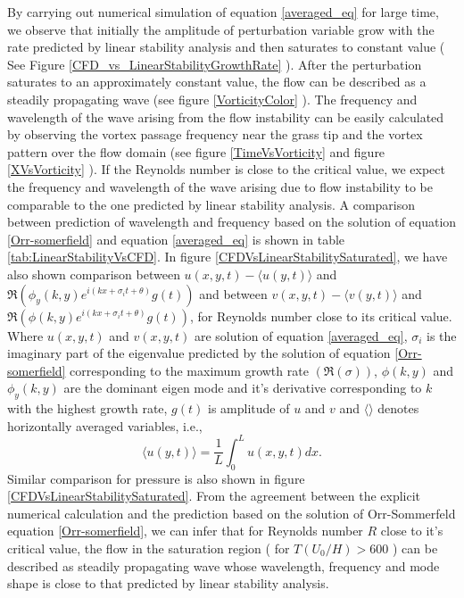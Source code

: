 \documentclass[12pt]{report}   %
\begin{document}
By carrying out numerical simulation of equation \eqref{averaged_eq} for large time, we observe that initially the amplitude of perturbation variable grow with the rate predicted by linear stability analysis and then saturates to constant value (  See Figure \ref{CFD_vs_LinearStabilityGrowthRate} ). After the perturbation saturates to an approximately constant value, the flow can be described as a steadily propagating wave (see figure \ref{VorticityColor} ). The frequency and wavelength of the wave arising from the flow instability can be easily calculated by observing the vortex passage frequency near the grass tip and the vortex pattern over the flow domain (see figure \ref{TimeVsVorticity} and figure \ref{XVsVorticity} ). If the Reynolds number is close to the critical value, we expect the frequency and wavelength of the wave arising due to flow instability to be comparable to the one predicted by linear stability analysis. A comparison between prediction of wavelength and frequency based on the solution of equation \eqref{Orr-somerfield} and equation \eqref{averaged_eq} is shown in table \ref{tab:LinearStabilityVsCFD}. In figure \ref{CFDVsLinearStabilitySaturated}, we have also shown comparison between $u(x,y,t)- \langle u(y,t) \rangle$ and 
 $\Re\left(\phi_y(k,y) e^{i\left(kx+\sigma_i t+ \theta\right)} g(t) \right)$  and between $v(x,y,t)-\langle v(y,t) \rangle$ and $\Re\left(\phi(k,y) e^{i\left(kx+\sigma_i t+ \theta\right)} g(t) \right)$, for Reynolds number close to its critical value. Where $u(x,y,t)$ and $v(x,y,t)$ are solution of equation \eqref{averaged_eq}, $\sigma_i$ is the imaginary part of the eigenvalue predicted by the solution of equation \eqref{Orr-somerfield} corresponding to the maximum growth rate $(\Re(\sigma))$, $\phi(k,y)$ and $\phi_y(k,y)$ are the dominant eigen mode and it's derivative corresponding to $k$ with the highest growth rate, $g(t)$ is amplitude of $u$ and $v$ and $\langle  \rangle$ denotes horizontally averaged variables, i.e.,
 \[\langle u(y,t) \rangle = \frac{1}{L}\int_{0}^{L} u(x,y,t) dx .\]
 Similar comparison for pressure is also shown in figure \ref{CFDVsLinearStabilitySaturated}. From the agreement between the explicit numerical calculation and the prediction based on the solution of Orr-Sommerfeld equation \eqref{Orr-somerfield}, we can infer that for Reynolds number $R$ close to it's critical value, the flow in the saturation region ( for $T(U_0/H)>600$ ) can be described as steadily propagating wave whose wavelength, frequency and mode shape is close to that predicted by linear stability analysis.  
\end{document}
